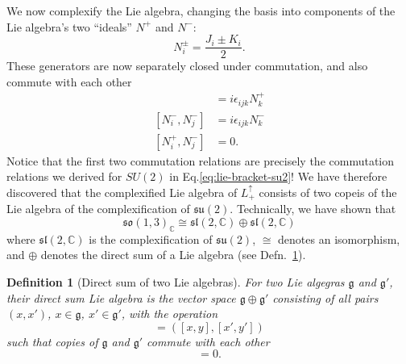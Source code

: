 \documentclass[11pt]{article}
\numberwithin{equation}{section}
\newtheorem{defn}{Definition}[section]
\begin{document}
We now complexify the Lie algebra, changing the basis into components of the Lie algebra's two ``ideals'' $N^+$ and $N^-$:
\begin{equation}
N_i^\pm = \frac{J_i \pm K_i}{2}.
\end{equation}
These generators are now separately closed under commutation, and also commute with each other
\begin{align}
[N_i^+, N_j^+] &= i \epsilon_{ijk} N_k^+ \\
[N_i^-, N_j^-] &= i \epsilon_{ijk} N_k^- \\
[N_i^+, N_j^-] &= 0.
\end{align}
Notice that the first two commutation relations are precisely the commutation relations we derived for $SU(2)$ in Eq.\eqref{eq:lie-bracket-su2}! We have therefore discovered that the complexified Lie algebra of $L^\uparrow_+$ consists of two copeis of the Lie algebra of the complexification of $\mathfrak{su}(2)$. Technically, we have shown that
\begin{equation}
\mathfrak{so}(1,3)_\mathbb{C}  \cong \mathfrak{sl}(2, \mathbb{C}) \oplus \mathfrak{sl}(2, \mathbb{C})
\end{equation}
where $\mathfrak{sl}(2, \mathbb{C})$ is the complexification of $\mathfrak{su}(2)$, $\cong$ denotes an isomorphism, and $\oplus$ denotes the direct sum of a Lie algebra (see Defn.~\ref{defn:direct-sum-lie-algebra}).

\begin{defn}[Direct sum of two Lie algebras] \label{defn:direct-sum-lie-algebra}
For two Lie algegras $\mathfrak{g}$ and $\mathfrak{g}'$, their direct sum Lie algebra is the vector space $\mathfrak{g} \oplus \mathfrak{g}'$ consisting of all pairs $(x, x')$, $x \in \mathfrak{g}$, $x' \in \mathfrak{g'}$, with the operation
\begin{equation}
[(x, x'), (y, y')] = ([x,y], [x',y'])
\end{equation}
such that copies of $\mathfrak{g}$ and $\mathfrak{g}'$ commute with each other
\begin{equation}
[(x,0),(0,x')] = 0. 
\end{equation}
\end{defn}


\newpage
 
\end{document}
